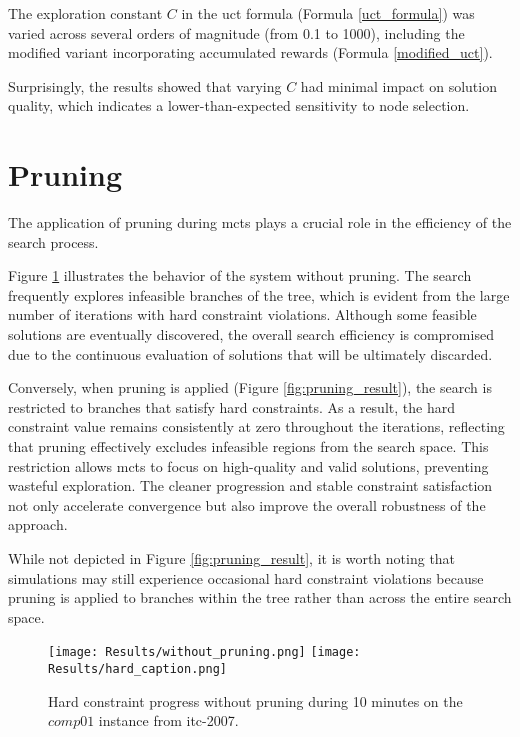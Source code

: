The exploration constant \(C\) in the \ac{uct} formula (Formula \ref{uct_formula}) was varied across several orders of magnitude (from 0.1 to 1000), including the modified variant incorporating accumulated rewards (Formula \ref{modified_uct}). 

Surprisingly, the results showed that varying \(C\) had minimal impact on solution quality, which indicates a lower-than-expected sensitivity to node selection.

\section{Pruning}

The application of pruning during \ac{mcts} plays a crucial role in the efficiency of the search process.

Figure \ref{fig:without_pruning_result} illustrates the behavior of the system without pruning. The search frequently explores infeasible branches of the tree, which is evident from the large number of iterations with hard constraint violations. Although some feasible solutions are eventually discovered, the overall search efficiency is compromised due to the continuous evaluation of solutions that will be ultimately discarded.

Conversely, when pruning is applied (Figure \ref{fig:pruning_result}), the search is restricted to branches that satisfy hard constraints. As a result, the hard constraint value remains consistently at zero throughout the iterations, reflecting that pruning effectively excludes infeasible regions from the search space. This restriction allows \ac{mcts} to focus on high-quality and valid solutions, preventing wasteful exploration. The cleaner progression and stable constraint satisfaction not only accelerate convergence but also improve the overall robustness of the approach. 

While not depicted in Figure \ref{fig:pruning_result}, it is worth noting that simulations may still experience occasional hard constraint violations because pruning is applied to branches within the tree rather than across the entire search space.

\begin{figure}
 \centering
     \texttt{[image: Results/without\_pruning.png]}
     \texttt{[image: Results/hard\_caption.png]}
     \caption{Hard constraint progress without pruning during 10 minutes on the \(comp01\) instance from \ac{itc-2007}.}
     \label{fig:without_pruning_result}
\end{figure}

